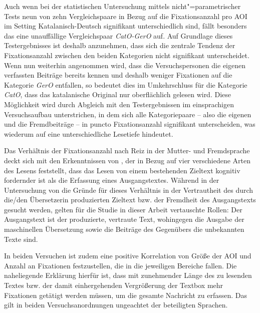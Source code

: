 Auch wenn bei der statistischen Untersuchung mittels nicht"=parametrischer Tests neun von zehn Vergleichspaare in Bezug auf die Fixationsanzahl pro AOI im Setting Katalanisch-Deutsch signifikant unterschiedlich sind, fällt besonders das eine unauffällige Vergleichspaar \emph{CatO-GerO} auf. Auf Grundlage dieses Testergebnisses ist deshalb anzunehmen, dass sich die zentrale Tendenz der Fixationsanzahl zwischen den beiden Kategorien nicht signifikant unterscheidet. Wenn nun weiterhin angenommen wird, dass die Versuchspersonen die eigenen verfassten Beiträge bereits kennen und deshalb weniger Fixationen auf die Kategorie \emph{GerO} entfallen, so bedeutet dies im Umkehrschluss für die Kategorie \emph{CatO}, dass das katalanische Original nur oberflächlich gelesen wird. Diese Möglichkeit wird durch Abgleich mit den Testergebnissen im einsprachigen Versuchsaufbau unterstrichen, in dem sich alle Kategoriepaare -- also die eigenen und die Fremdbeiträge -- in puncto Fixationsanzahl signifikant unterscheiden, was wiederum auf eine unterschiedliche Lesetiefe hindeutet.

Das Verhältnis der Fixationsanzahl nach Reiz in der Mutter- und Fremdsprache deckt sich mit den Erkenntnissen von \citet[70]{jakobsen_chapter_2017}, der in Bezug auf vier verschiedene Arten des Lesens feststellt, dass das Lesen von einem bestehenden Zieltext kognitiv fordernder ist als die Erfassung eines Ausgangstextes. Während in der Untersuchung von \citeauthor{jakobsen_chapter_2017} die Gründe für dieses Verhältnis in der Vertrautheit des durch die/den Übersetzer{\textperiodcentered}in produzierten Zieltext bzw. der Fremdheit des Ausgangstexts gesucht werden, gelten für die Studie in dieser Arbeit vertauschte Rollen: Der Ausgangstext ist der produzierte, vertraute Text, wohingegen die Ausgabe der maschinellen Übersetzung sowie die Beiträge des Gegenübers die unbekannten Texte sind.

In beiden Versuchen ist zudem eine positive Korrelation von Größe der AOI und Anzahl an Fixationen festzustellen, die in die jeweiligen Bereiche fallen. Die naheliegende Erklärung hierfür ist, dass mit zunehmender Länge des zu lesenden Textes bzw. der damit einhergehenden Vergrößerung der Textbox mehr Fixationen getätigt werden müssen, um die gesamte Nachricht zu erfassen. Das gilt in beiden Versuchsanordnungen ungeachtet der beteiligten Sprachen.




